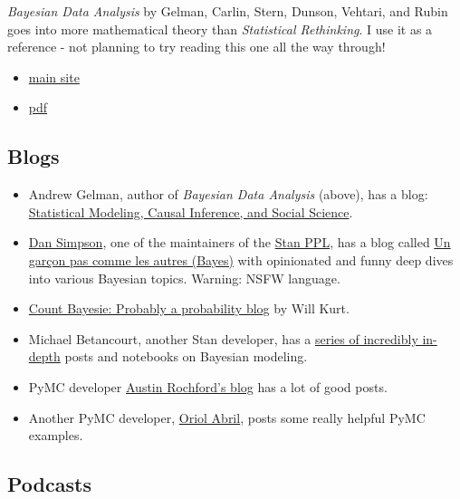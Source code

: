 \documentclass[
  letterpaper,
  DIV=11,
  numbers=noendperiod]{scrreprt}
\providecommand{\tightlist}{%
  \setlength{\itemsep}{0pt}\setlength{\parskip}{0pt}}\usepackage{longtable,booktabs,array}
\begin{document}
\emph{Bayesian Data Analysis} by Gelman, Carlin, Stern, Dunson, Vehtari,
and Rubin goes into more mathematical theory than \emph{Statistical
Rethinking}. I use it as a reference - not planning to try reading this
one all the way through!

\begin{itemize}
\item
  \href{http://www.stat.columbia.edu/~gelman/book/}{main site}
\item
  \href{http://www.stat.columbia.edu/~gelman/book/BDA3.pdf}{pdf}
\end{itemize}

\hypertarget{blogs}{%
\subsection*{Blogs}\label{blogs}}

\begin{itemize}
\tightlist
\item
  Andrew Gelman, author of \emph{Bayesian Data Analysis} (above), has a
  blog: \href{https://statmodeling.stat.columbia.edu/}{Statistical
  Modeling, Causal Inference, and Social Science}.
\item
  \href{https://dpsimpson.github.io/}{Dan Simpson}, one of the
  maintainers of the \href{https://mc-stan.org/}{Stan PPL}, has a blog
  called \href{https://dansblog.netlify.app/}{Un garçon pas comme les
  autres (Bayes)} with opinionated and funny deep dives into various
  Bayesian topics. Warning: NSFW language.
\item
  \href{https://www.countbayesie.com/}{Count Bayesie: Probably a
  probability blog} by Will Kurt.
\item
  Michael Betancourt, another Stan developer, has a
  \href{https://betanalpha.github.io/writing/}{series of incredibly
  in-depth} posts and notebooks on Bayesian modeling.
\item
  PyMC developer \href{https://austinrochford.com/posts.html}{Austin
  Rochford's blog} has a lot of good posts.
\item
  Another PyMC developer, \href{https://oriolabrilpla.cat/blog/}{Oriol
  Abril}, posts some really helpful PyMC examples.
\end{itemize}

\hypertarget{podcasts}{%
\subsection*{Podcasts}\label{podcasts}}
\end{document}
